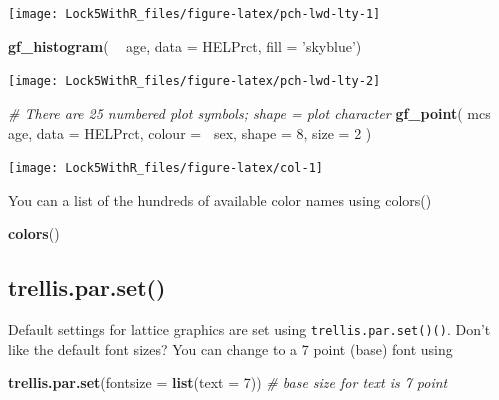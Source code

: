 \documentclass[]{book}
\newenvironment{Shaded}{\begin{snugshade}}{\end{snugshade}}
\newcommand{\CommentTok}[1]{\textcolor[rgb]{0.56,0.35,0.01}{\textit{#1}}}
\newcommand{\DataTypeTok}[1]{\textcolor[rgb]{0.13,0.29,0.53}{#1}}
\newcommand{\DecValTok}[1]{\textcolor[rgb]{0.00,0.00,0.81}{#1}}
\newcommand{\KeywordTok}[1]{\textcolor[rgb]{0.13,0.29,0.53}{\textbf{#1}}}
\newcommand{\NormalTok}[1]{#1}
\newcommand{\OperatorTok}[1]{\textcolor[rgb]{0.81,0.36,0.00}{\textbf{#1}}}
\newcommand{\StringTok}[1]{\textcolor[rgb]{0.31,0.60,0.02}{#1}}
\begin{document}
\texttt{[image: Lock5WithR\_files/figure-latex/pch-lwd-lty-1]}

\begin{Shaded}
\begin{Highlighting}[]
\KeywordTok{gf_histogram}\NormalTok{( }\OperatorTok{~}\StringTok{ }\NormalTok{age, }\DataTypeTok{data =}\NormalTok{ HELPrct, }\DataTypeTok{fill =} \StringTok{'skyblue'}\NormalTok{)}
\end{Highlighting}
\end{Shaded}

\texttt{[image: Lock5WithR\_files/figure-latex/pch-lwd-lty-2]}

\begin{Shaded}
\begin{Highlighting}[]
\CommentTok{# There are 25 numbered plot symbols; shape = plot character}
\KeywordTok{gf_point}\NormalTok{( mcs }\OperatorTok{~}\StringTok{ }\NormalTok{age, }\DataTypeTok{data =}\NormalTok{ HELPrct, }\DataTypeTok{colour =} \OperatorTok{~}\NormalTok{sex, }
        \DataTypeTok{shape =} \DecValTok{8}\NormalTok{, }\DataTypeTok{size =} \DecValTok{2}\NormalTok{ )  }
\end{Highlighting}
\end{Shaded}

\texttt{[image: Lock5WithR\_files/figure-latex/col-1]}

You can a list of the hundreds of available color names using
colors()

\begin{Shaded}
\begin{Highlighting}[]
\KeywordTok{colors}\NormalTok{()}
\end{Highlighting}
\end{Shaded}

\hypertarget{trellis.par.set}{%
\subsection{trellis.par.set()}\label{trellis.par.set}}

Default settings for lattice graphics are set using
\texttt{trellis.par.set()()}.
Don't like the default font sizes? You can change to a 7 point (base) font using

\begin{Shaded}
\begin{Highlighting}[]
\KeywordTok{trellis.par.set}\NormalTok{(}\DataTypeTok{fontsize =} \KeywordTok{list}\NormalTok{(}\DataTypeTok{text =} \DecValTok{7}\NormalTok{))    }\CommentTok{# base size for text is 7 point }
\end{Highlighting}
\end{Shaded}
\end{document}
